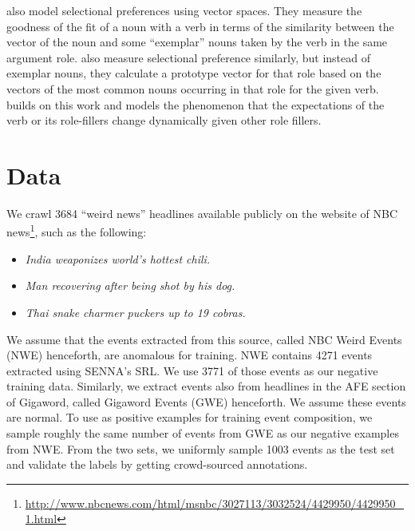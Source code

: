 \cite{erk2010flexible} also model selectional preferences using vector spaces.  
They measure the 
goodness of the fit of a noun with a verb in terms of the similarity between the 
vector of the noun and 
some ``exemplar'' nouns taken by the verb in the same argument role.  
\cite{baroni2010distributional} 
also measure selectional preference similarly, but instead of exemplar nouns, 
they calculate a 
prototype vector for that role based on the vectors of the most common nouns 
occurring in that 
role for the given verb.  \cite{lenci2011composing} builds on this work and 
models the phenomenon
that the expectations of the verb or its role-fillers change dynamically given 
other role fillers.


\section{Data}
We crawl 3684 ``weird news'' headlines available publicly 
on the website of NBC
news\footnote{\url{
http://www.nbcnews.com/html/msnbc/3027113/3032524/4429950/4429950_1.html}}, 
such as the following: 
\begin{itemize}
 \item[] \textit{India weaponizes world's hottest chili.}
 \item[] \textit{Man recovering after being shot by his dog.}
 \item[] \textit{Thai snake charmer puckers up to 19 cobras.}
\end{itemize}
We assume that the events extracted from this source, called NBC Weird Events
(NWE) henceforth, are
anomalous for training.  NWE contains 4271 events extracted using 
SENNA's SRL.  We use 3771 of those events as our negative training data. 
Similarly, we extract events also from
headlines in the AFE section of Gigaword, called Gigaword Events (GWE)
henceforth.  We assume these events are normal.
To use as positive examples for training event composition, we sample roughly
the same number of events from 
GWE as our negative examples from NWE. From the two sets, we uniformly sample 
1003 events
as the test set and validate the labels by getting crowd-sourced annotations.

